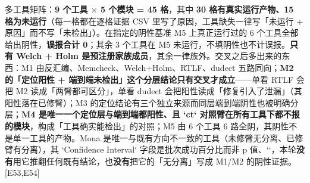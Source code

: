 \documentclass[UTF8,fontset=fandol,11pt,a4paper]{ctexart}
\begin{document}
多工具矩阵：\textbf{9 个工具 \texorpdfstring{$\times$}{x} 5 个模块 = 45 格}，其中 \textbf{30 格有真实运行产物、15 格为未运行}（每一格都在逐格证据 CSV 里写了原因，工具缺失一律写「未运行 + 原因」而不写「未检出」）。在指定的阴性基准 M5 上真正运行过的 6 个工具全部给出阴性，\textbf{误报合计 0}；其余 3 个工具在 M5 未运行，不填阴性也不计误报。\textbf{只有 Welch + Holm 是预注册家族成员}，其余一律族外。交叉之后多出来的东西：M1 由反汇编、Memcheck、Welch+Holm、RTLF、dudect 五路同向；\textbf{M2 的「定位阳性 + 端到端未检出」这个分层结论只有交叉才成立}——单看 RTLF 会把 M2 读成「两臂都可区分」，单看 dudect 会把阳性读成「修复引入了泄漏」（其阳性落在已修臂）；M3 的定位结论有三个独立来源而同层端到端阴性也被明确分层；\textbf{M4 是唯一一个定位层与端到端都阳性、且 `ct` 对照臂在所有工具下都不报的模块}，构成「工具确实能检出」的对照；M5 由 6 个工具 6 路全阴，其阴性不是单一工具的产物。Mona 是唯一与既有方向不一致的工具（未修臂无分离、已修臂有分离），其 `Confidence Interval` 字段是批次成功百分比而非 p 值、`\texttt{}`，本轮\textbf{没有}用它推翻任何既有结论，也\textbf{没有}把它的「无分离」写成 M1/M2 的阴性证据。 [E53,E54]
\end{document}
